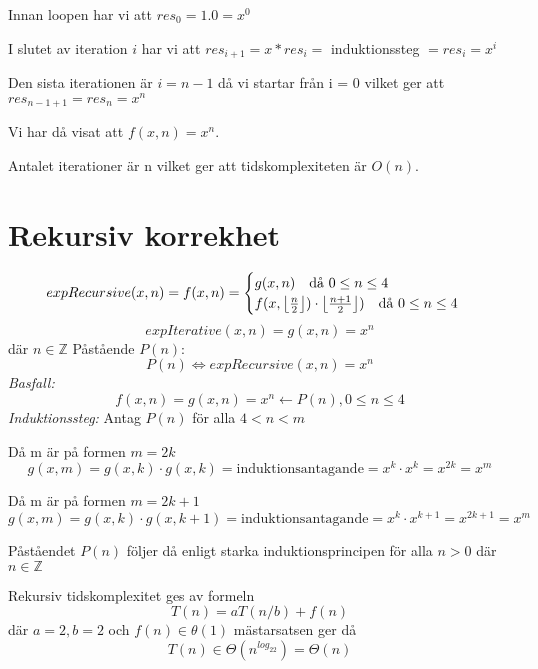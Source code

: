 \documentclass{article}
\DeclarePairedDelimiter\floor{\lfloor}{\rfloor}
\begin{document}
Innan loopen har vi att $res_0 = 1.0 = x^0$

I slutet av iteration $i$ har vi att $res_{i + 1} = x * res_i = $ {induktionssteg} $ = res_i = x ^ i$

Den sista iterationen är $i = n - 1$ då vi startar från i = 0 vilket ger att $res_{n - 1 + 1} = res_n = x ^ {n}$

Vi har då visat att $f(x, n) = x ^ n$.

Antalet iterationer är n vilket ger att tidskomplexiteten är $O(n)$.

\section{Rekursiv korrekhet}
\begin{equation*}
expRecursive(x, n) = f(x, n) = 
  \begin{cases}
    g(x ,n) \quad \text{då } 0 \le n \le 4\\
    f(x, \floor*{\frac{n}{2}}) \cdot \floor*{\frac{n + 1}{2}}) \quad \text{då } 0 \le n \le 4\\
  \end{cases}
\end{equation*}
\[ expIterative(x, n) = g(x, n) = x ^ n \]
där $n \in \mathbb{Z}$
Påstående $P(n)$:
\[ P(n) \Longleftrightarrow expRecursive(x, n) = x ^ n \]
\textit{Basfall:}
\[ f(x, n) = g(x, n) = x ^ n \longleftarrow P(n), 0 \le n \le 4 \]
\textit{Induktionssteg:} Antag $P(n)$ för alla $ 4 < n < m$

Då m är på formen $m = 2k$
\[ g(x, m) = g(x, k) \cdot g(x, k) = \text{induktionsantagande} = x ^ k \cdot x ^ k = x ^ {2k} = x ^ m \]

Då m är på formen $m = 2k + 1$
\[ g(x, m) = g(x, k) \cdot g(x, k + 1) = \text{induktionsantagande} = x ^ k \cdot x ^ {k + 1} = x ^ {2k + 1} = x ^ m \]

Påståendet $P(n)$ följer då enligt starka induktionsprincipen för alla $n > 0$ där $n \in \mathbb{Z}$

Rekursiv tidskomplexitet ges av formeln
\[ T(n) = aT(n/b) + f(n) \]
där $a = 2, b = 2$ och $f(n) \in \theta(1)$ mästarsatsen ger då
\[ T(n) \in \Theta(n ^ {log_22}) = \Theta(n) \]
\end{document}
